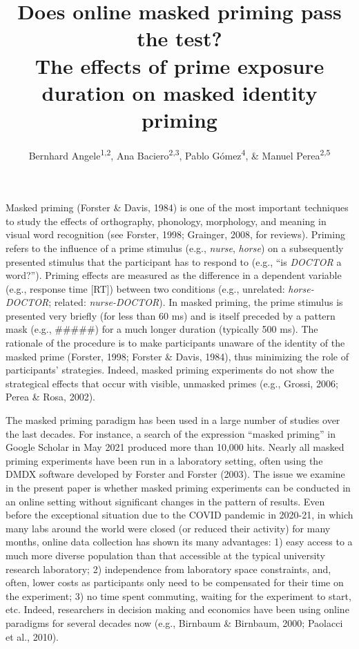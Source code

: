 \documentclass[
  english,
  man,floatsintext]{apa6}
\title{Does online masked priming pass the test?\\
The effects of prime exposure duration on masked identity priming}
\author{Bernhard Angele\textsuperscript{1,2}, Ana Baciero\textsuperscript{2,3}, Pablo Gómez\textsuperscript{4}, \& Manuel Perea\textsuperscript{2,5}}
\date{}
\affiliation{\vspace{0.5cm}\textsuperscript{1} Bournemouth University, Bournemouth, UK\\\textsuperscript{2} Universidad Antonio de Nebrija, Madrid, Spain\\\textsuperscript{3} DePaul University, Chicago, USA\\\textsuperscript{4} California State University San Bernardino, Palm Desert Campus, USA\\\textsuperscript{5} Universitat de València, Valencia, Spain}
\begin{document}
\maketitle

Masked priming (Forster \& Davis, 1984) is one of the most important techniques to study the effects of orthography, phonology, morphology, and meaning in visual word recognition (see Forster, 1998; Grainger, 2008, for reviews). Priming refers to the influence of a prime stimulus (e.g., \emph{nurse}, \emph{horse}) on a subsequently presented stimulus that the participant has to respond to (e.g., ``is \emph{DOCTOR} a word?''). Priming effects are measured as the difference in a dependent variable (e.g., response time {[}RT{]}) between two conditions (e.g., unrelated: \emph{horse-DOCTOR}; related: \emph{nurse-DOCTOR}). In masked priming, the prime stimulus is presented very briefly (for less than 60 ms) and is itself preceded by a pattern mask (e.g., \#\#\#\#\#) for a much longer duration (typically 500 ms). The rationale of the procedure is to make participants unaware of the identity of the masked prime (Forster, 1998; Forster \& Davis, 1984), thus minimizing the role of participants' strategies. Indeed, masked priming experiments do not show the strategical effects that occur with visible, unmasked primes (e.g., Grossi, 2006; Perea \& Rosa, 2002).

The masked priming paradigm has been used in a large number of studies over the last decades. For instance, a search of the expression ``masked priming'' in Google Scholar in May 2021 produced more than 10,000 hits. Nearly all masked priming experiments have been run in a laboratory setting, often using the DMDX software developed by Forster and Forster (2003). The issue we examine in the present paper is whether masked priming experiments can be conducted in an online setting without significant changes in the pattern of results. Even before the exceptional situation due to the COVID pandemic in 2020-21, in which many labs around the world were closed (or reduced their activity) for many months, online data collection has shown its many advantages: 1) easy access to a much more diverse population than that accessible at the typical university research laboratory; 2) independence from laboratory space constraints, and, often, lower costs as participants only need to be compensated for their time on the experiment; 3) no time spent commuting, waiting for the experiment to start, etc. Indeed, researchers in decision making and economics have been using online paradigms for several decades now (e.g., Birnbaum \& Birnbaum, 2000; Paolacci et al., 2010).
\end{document}
